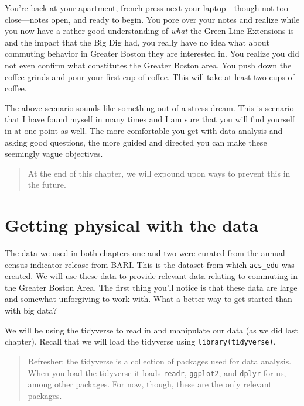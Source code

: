 \documentclass[
]{book}
\begin{document}
You're back at your apartment, french press next your laptop---though not too close---notes open, and ready to begin. You pore over your notes and realize while you now have a rather good understanding of \emph{what} the Green Line Extensions is and the impact that the Big Dig had, you really have no idea what about commuting behavior in Greater Boston they are interested in. You realize you did not even confirm what constitutes the Greater Boston area. You push down the coffee grinds and pour your first cup of coffee. This will take at least two cups of coffee.

The above scenario sounds like something out of a stress dream. This is scenario that I have found myself in many times and I am sure that you will find yourself in at one point as well. The more comfortable you get with data analysis and asking good questions, the more guided and directed you can make these seemingly vague objectives.

\begin{quote}
At the end of this chapter, we will expound upon ways to prevent this in the future.
\end{quote}

\hypertarget{getting-physical-with-the-data}{%
\section{Getting physical with the data}\label{getting-physical-with-the-data}}

The data we used in both chapters one and two were curated from the \href{https://dataverse.harvard.edu/dataset.xhtml?persistentId=doi:10.7910/DVN/XZXAUP}{annual census indicator release} from BARI. This is the dataset from which \texttt{acs\_edu} was created. We will use these data to provide relevant data relating to commuting in the Greater Boston Area. The first thing you'll notice is that these data are large and somewhat unforgiving to work with. What a better way to get started than with big data?

We will be using the tidyverse to read in and manipulate our data (as we did last chapter). Recall that we will load the tidyverse using \texttt{library(tidyverse)}.

\begin{quote}
Refresher: the tidyverse is a collection of packages used for data analysis. When you load the tidyverse it loads \texttt{readr}, \texttt{ggplot2}, and \texttt{dplyr} for us, among other packages. For now, though, these are the only relevant packages.
\end{quote}
\end{document}
